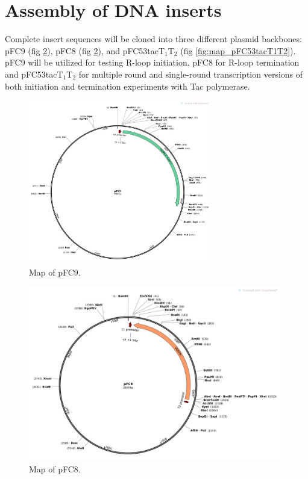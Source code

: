\documentclass[11pt]{article}
\begin{document}
\section{Assembly of DNA inserts}

Complete insert sequences will be cloned into three different plasmid backbones: pFC9 (fig \ref{fig:map_pFC8}), pFC8 (fig \ref{fig:map_pFC8}), and pFC53tacT$_1$T$_2$ (fig \ref{fig:map_pFC53tacT1T2}). pFC9 will be utilized for testing R-loop initiation, pFC8 for R-loop termination and pFC53tacT$_1$T$_2$ for multiple round and single-round transcription versions of both initiation and termination experiments with Tac polymerase. 


\begin{figure}[H]
	\includegraphics[width=8cm]{images/plasmid_maps/pFC9_Map.png}
	\centering
	\caption{Map of pFC9.}
	\label{fig:map_pFC9}
\end{figure}


\begin{figure}[H]
	\includegraphics[width=11cm]{images/plasmid_maps/pFC8_Map.png}
	\centering
	\caption{Map of pFC8.}
	\label{fig:map_pFC8}
\end{figure}
\end{document}
